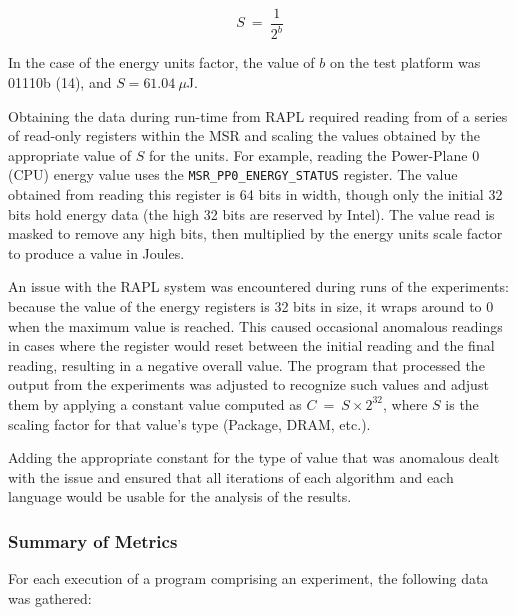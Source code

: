 \[S~=~\frac{1}{2^{b}}\]

In the case of the energy units factor, the value of $b$ on the test platform was 01110b (14), and $S = 61.04~\mu$J.

Obtaining the data during run-time from RAPL required reading from of a series of read-only registers within the MSR and scaling the values obtained by the appropriate value of $S$ for the units. For example, reading the Power-Plane 0 (CPU) energy value uses the \texttt{MSR\_PP0\_ENERGY\_STATUS} register. The value obtained from reading this register is 64 bits in width, though only the initial 32 bits hold energy data (the high 32 bits are reserved by Intel). The value read is masked to remove any high bits, then multiplied by the energy units scale factor to produce a value in Joules.

An issue with the RAPL system was encountered during runs of the experiments: because the value of the energy registers is 32 bits in size, it wraps around to 0 when the maximum value is reached. This caused occasional anomalous readings in cases where the register would reset between the initial reading and the final reading, resulting in a negative overall value. The program that processed the output from the experiments was adjusted to recognize such values and adjust them by applying a constant value computed as $C~=~S \times 2^{32}$, where $S$ is the scaling factor for that value's type (Package, DRAM, etc.).

Adding the appropriate constant for the type of value that was anomalous dealt with the issue and ensured that all iterations of each algorithm and each language would be usable for the analysis of the results.

\subsubsection{Summary of Metrics}

For each execution of a program comprising an experiment, the following data was gathered:

